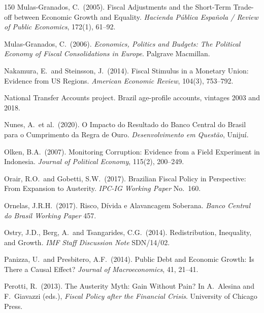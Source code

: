 \documentclass[11pt,a4paper]{article}
\begin{document}
\begin{thebibliography}{150}
 Mulas-Granados, C.\ (2005). Fiscal Adjustments and the Short-Term Trade-off between Economic Growth and Equality. \textit{Hacienda P\'ublica Espa\~nola / Review of Public Economics}, 172(1), 61--92.

 Mulas-Granados, C.\ (2006). \textit{Economics, Politics and Budgets: The Political Economy of Fiscal Consolidations in Europe}. Palgrave Macmillan.

 Nakamura, E.\ and Steinsson, J.\ (2014). Fiscal Stimulus in a Monetary Union: Evidence from US Regions. \textit{American Economic Review}, 104(3), 753--792.

 National Transfer Accounts project. Brazil age-profile accounts, vintages 2003 and 2018.

 Nunes, A.\ et al.\ (2020). O Impacto do Resultado do Banco Central do Brasil para o Cumprimento da Regra de Ouro. \textit{Desenvolvimento em Quest\~ao}, Unijuí.

 Olken, B.A.\ (2007). Monitoring Corruption: Evidence from a Field Experiment in Indonesia. \textit{Journal of Political Economy}, 115(2), 200--249.

 Orair, R.O.\ and Gobetti, S.W.\ (2017). Brazilian Fiscal Policy in Perspective: From Expansion to Austerity. \textit{IPC-IG Working Paper} No.\ 160.

 Ornelas, J.R.H.\ (2017). Risco, D\'ivida e Alavancagem Soberana. \textit{Banco Central do Brasil Working Paper} 457.

 Ostry, J.D., Berg, A.\ and Tsangarides, C.G.\ (2014). Redistribution, Inequality, and Growth. \textit{IMF Staff Discussion Note} SDN/14/02.

 Panizza, U.\ and Presbitero, A.F.\ (2014). Public Debt and Economic Growth: Is There a Causal Effect? \textit{Journal of Macroeconomics}, 41, 21--41.

 Perotti, R.\ (2013). The Austerity Myth: Gain Without Pain? In A.\ Alesina and F.\ Giavazzi (eds.), \textit{Fiscal Policy after the Financial Crisis}. University of Chicago Press.


\end{thebibliography}
\end{document}
